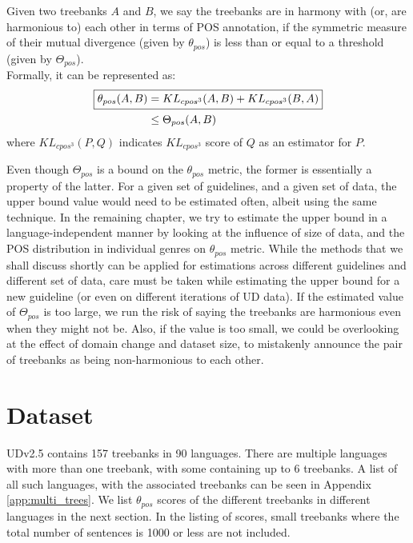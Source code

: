\begin{definition}
\label{def:harmony}
Given two treebanks $A$ and $B$, we say the treebanks are in harmony with (or, are harmonious to) each other in terms of POS annotation, if the symmetric measure of their mutual divergence (given by $\theta_{pos}$) is less than or equal to a threshold (given by $\Theta_{pos}$). \\
    Formally, it can be represented as:
    \begin{align}
    \label{eq:pos_harmony}
        \Aboxed{\theta_{pos}(A, B) & = \nonumber KL_{cpos^3}(A,B) + KL_{cpos^3}(B,A)} \\
        &\leq \Theta_{pos}(A, B)
    \end{align}
    where $KL_{cpos^3}(P,Q)$ indicates $KL_{cpos^3}$ score of $Q$ as an estimator for $P$.
\end{definition}

Even though $\Theta_{pos}$ is a bound on the $\theta_{pos}$ metric, the former is essentially a property of the latter. For a given set of guidelines, and a given set of data, the upper bound value would need to be estimated often, albeit using the same technique. In the remaining chapter, we try to estimate the upper bound in a language-independent manner by looking at the influence of size of data, and the POS distribution in individual genres on $\theta_{pos}$ metric. While the methods that we shall discuss shortly can be applied for estimations across different guidelines and different set of data, care must be taken while estimating the upper bound for a new guideline (or even on different iterations of UD data). If the estimated value of $\Theta_{pos}$ is too large, we run the risk of saying the treebanks are harmonious even when they might not be. Also, if the value is too small, we could be overlooking at the effect of domain change and dataset size, to mistakenly announce the pair of treebanks as being non-harmonious to each other.

\section{Dataset}
\label{sec:pos-harmony-dataset}

UDv2.5 \citep{UDv2.5} contains 157 treebanks in 90 languages. There are multiple languages with more than one treebank, with some containing up to 6 treebanks. A list of all such languages, with the associated treebanks can be seen in Appendix \ref{app:multi_trees}. We list $\theta_{pos}$ scores of the different treebanks in different languages in the next section. In the listing of scores, small treebanks where the total number of sentences is 1000 or less are not included.

